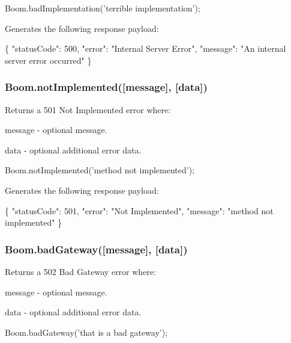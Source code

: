 \begin{DoxyCode}
Boom.badImplementation('terrible implementation');
\end{DoxyCode}


Generates the following response payload\+:


\begin{DoxyCode}
\{
    "statusCode": 500,
    "error": "Internal Server Error",
    "message": "An internal server error occurred"
\}
\end{DoxyCode}


\subsubsection*{{\ttfamily Boom.\+not\+Implemented(\mbox{[}message\mbox{]}, \mbox{[}data\mbox{]})}}

Returns a 501 Not Implemented error where\+:
\begin{DoxyItemize}
\item {\ttfamily message} -\/ optional message.
\item {\ttfamily data} -\/ optional additional error data.
\end{DoxyItemize}


\begin{DoxyCode}
Boom.notImplemented('method not implemented');
\end{DoxyCode}


Generates the following response payload\+:


\begin{DoxyCode}
\{
    "statusCode": 501,
    "error": "Not Implemented",
    "message": "method not implemented"
\}
\end{DoxyCode}


\subsubsection*{{\ttfamily Boom.\+bad\+Gateway(\mbox{[}message\mbox{]}, \mbox{[}data\mbox{]})}}

Returns a 502 Bad Gateway error where\+:
\begin{DoxyItemize}
\item {\ttfamily message} -\/ optional message.
\item {\ttfamily data} -\/ optional additional error data.
\end{DoxyItemize}


\begin{DoxyCode}
Boom.badGateway('that is a bad gateway');
\end{DoxyCode}


